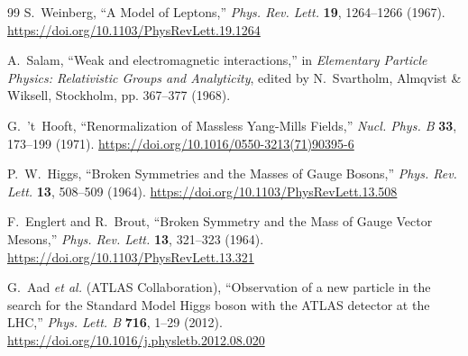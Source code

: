 \documentclass[%
 reprint,
 amsmath,amssymb,
 aps,
]{revtex4-1}
\numberwithin{equation}{section}%
\begin{document}
\begin{thebibliography}{99}
S.~Weinberg, 
``A Model of Leptons,'' 
\textit{Phys. Rev. Lett.} \textbf{19}, 1264--1266 (1967).
\href{https://doi.org/10.1103/PhysRevLett.19.1264}{https://doi.org/10.1103/PhysRevLett.19.1264}

A.~Salam, 
``Weak and electromagnetic interactions,'' 
in \textit{Elementary Particle Physics: Relativistic Groups and Analyticity}, edited by N.~Svartholm, 
Almqvist \& Wiksell, Stockholm, pp. 367--377 (1968).

G.~'t~Hooft, 
``Renormalization of Massless Yang-Mills Fields,'' 
\textit{Nucl. Phys. B} \textbf{33}, 173--199 (1971).
\href{https://doi.org/10.1016/0550-3213(71)90395-6}{https://doi.org/10.1016/0550-3213(71)90395-6}

P.~W.~Higgs, 
``Broken Symmetries and the Masses of Gauge Bosons,'' 
\textit{Phys. Rev. Lett.} \textbf{13}, 508--509 (1964).
\href{https://doi.org/10.1103/PhysRevLett.13.508}{https://doi.org/10.1103/PhysRevLett.13.508}

F.~Englert and R.~Brout, 
``Broken Symmetry and the Mass of Gauge Vector Mesons,'' 
\textit{Phys. Rev. Lett.} \textbf{13}, 321--323 (1964).
\href{https://doi.org/10.1103/PhysRevLett.13.321}{https://doi.org/10.1103/PhysRevLett.13.321}

G.~Aad \textit{et al.} (ATLAS Collaboration), 
``Observation of a new particle in the search for the Standard Model Higgs boson with the ATLAS detector at the LHC,'' 
\textit{Phys. Lett. B} \textbf{716}, 1--29 (2012).
\href{https://doi.org/10.1016/j.physletb.2012.08.020}{https://doi.org/10.1016/j.physletb.2012.08.020}


\end{thebibliography}
\end{document}
